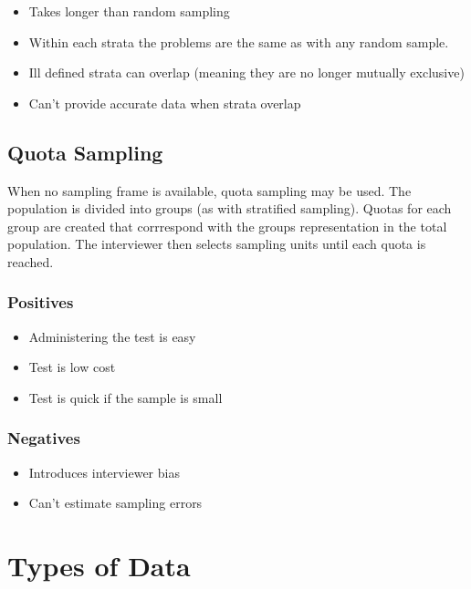 \documentclass{article}
\begin{document}
\begin{itemize}

    \item Takes longer than random sampling 
    \item Within each strata the problems are the same as with any random sample.
    \item Ill defined strata can overlap (meaning they are no longer mutually
        exclusive) 
    \item Can't provide accurate data when strata overlap
    
\end{itemize}

\subsection{Quota Sampling}

When no sampling frame is available, quota sampling may be used. The population
is divided into groups (as with stratified sampling). Quotas for each group are
created that corrrespond with the groups representation in the total population.
The interviewer then selects sampling units until each quota is reached.

\subsubsection{Positives}

\begin{itemize}

    \item Administering the test is easy 
    \item Test is low cost 
    \item Test is quick if the sample is small
    
\end{itemize}

\subsubsection{Negatives}

\begin{itemize}

    \item Introduces interviewer bias 
    \item Can't estimate sampling errors
    
\end{itemize}

\section{Types of Data}
\end{document}

